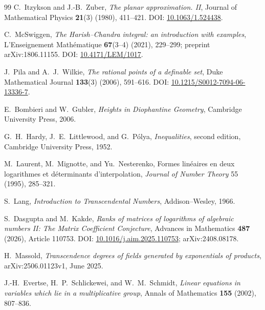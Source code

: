 \documentclass[11pt,oneside]{article}
\theoremstyle{definition}
\theoremstyle{remark}
\begin{document}
\begin{thebibliography}{99}
C.~Itzykson and J.-B.~Zuber,
\newblock \emph{The planar approximation. II},
\newblock Journal of Mathematical Physics \textbf{21}(3) (1980), 411--421.
\newblock DOI: \href{https://doi.org/10.1063/1.524438}{10.1063/1.524438}.

C.~McSwiggen,
\newblock \emph{The Harish--Chandra integral: an introduction with examples},
\newblock L'Enseignement Math\'ematique \textbf{67}(3--4) (2021), 229--299;
preprint arXiv:1806.11155.
\newblock DOI: \href{https://doi.org/10.4171/LEM/1017}{10.4171/LEM/1017}.

J.~Pila and A.~J.~Wilkie,
\newblock \emph{The rational points of a definable set},
\newblock Duke Mathematical Journal \textbf{133}(3) (2006), 591--616.
\newblock DOI: \href{https://doi.org/10.1215/S0012-7094-06-13336-7}{10.1215/S0012-7094-06-13336-7}.


E.~Bombieri and W.~Gubler,
\newblock \emph{Heights in Diophantine Geometry},
\newblock Cambridge University Press, 2006.

G.~H.~Hardy, J.~E.~Littlewood, and G.~P\'olya,
\newblock \emph{Inequalities}, second edition,
\newblock Cambridge University Press, 1952.

M.~Laurent, M.~Mignotte, and Yu.~Nesterenko,
\newblock Formes lin\'eaires en deux logarithmes et d\'eterminants
 d'interpolation,
\newblock \emph{Journal of Number Theory} 55 (1995), 285--321.

S.~Lang,
\newblock \emph{Introduction to Transcendental Numbers},
\newblock Addison--Wesley, 1966.

S.~Dasgupta and M.~Kakde,
\newblock \emph{Ranks of matrices of logarithms of algebraic numbers II: The Matrix
Coefficient Conjecture},
\newblock Advances in Mathematics \textbf{487} (2026), Article 110753.
\newblock DOI:
\href{https://doi.org/10.1016/j.aim.2025.110753}{10.1016/j.aim.2025.110753};
arXiv:2408.08178.

H.~Massold,
\newblock \emph{Transcendence degrees of fields generated by exponentials of products},
\newblock arXiv:2506.01123v1, June 2025.

J.-H.~Evertse, H.~P.~Schlickewei, and W.~M.~Schmidt,
\newblock \emph{Linear equations in variables which lie in a multiplicative group},
\newblock Annals of Mathematics \textbf{155} (2002), 807--836.


\end{thebibliography}
\end{document}
